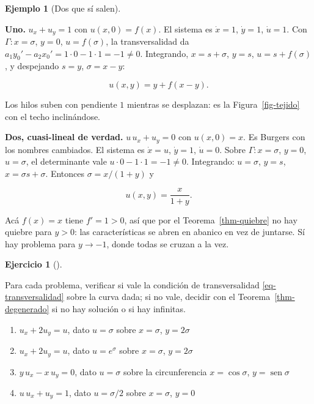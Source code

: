 \documentclass[
  spanish,
  a4paper,
]{scrbook}
\providecommand{\tightlist}{%
  \setlength{\itemsep}{0pt}\setlength{\parskip}{0pt}}
\theoremstyle{definition}
\theoremstyle{plain}
\theoremstyle{definition}
\newtheorem{example}{Ejemplo}[chapter]
\theoremstyle{plain}
\theoremstyle{definition}
\newtheorem{exercise}{Ejercicio}[chapter]
\theoremstyle{remark}
\begin{document}
\begin{example}[Dos que sí
salen]\protect\hypertarget{exm-dos-buenos}{}\label{exm-dos-buenos}

\textbf{Uno.} \(u_x + u_y = 1\) con \(u(x,0) = f(x)\). El sistema es
\(\dot x = 1\), \(\dot y = 1\), \(\dot u = 1\). Con
\(\Gamma: x=\sigma\), \(y=0\), \(u=f(\sigma)\), la transversalidad da
\(a_1y_0' - a_2x_0' = 1\cdot 0 - 1\cdot 1 = -1 \ne 0\). Integrando,
\(x = s+\sigma\), \(y = s\), \(u = s + f(\sigma)\), y despejando
\(s = y\), \(\sigma = x - y\):

\[
u(x,y) = y + f(x-y).
\]

Los hilos suben con pendiente \(1\) mientras se desplazan: es la
Figura~\ref{fig-tejido} con el techo inclinándose.

\textbf{Dos, cuasi-lineal de verdad.} \(u\,u_x + u_y = 0\) con
\(u(x,0) = x\). Es Burgers con los nombres cambiados. El sistema es
\(\dot x = u\), \(\dot y = 1\), \(\dot u = 0\). Sobre
\(\Gamma: x=\sigma\), \(y=0\), \(u=\sigma\), el determinante vale
\(u\cdot 0 - 1\cdot 1 = -1 \ne 0\). Integrando: \(u = \sigma\),
\(y = s\), \(x = \sigma s + \sigma\). Entonces \(\sigma = x/(1+y)\) y

\[
u(x,y) = \frac{x}{1+y}.
\]

Acá \(f(x)=x\) tiene \(f' = 1 > 0\), así que por el
Teorema~\ref{thm-quiebre} no hay quiebre para \(y>0\): las
características se abren en abanico en vez de juntarse. Sí hay problema
para \(y \to -1\), donde todas se cruzan a la vez.

\end{example}

\begin{exercise}[]\protect\hypertarget{exr-transversalidad-cuentas}{}\label{exr-transversalidad-cuentas}

Para cada problema, verificar si vale la condición de transversalidad
\ref{eq-transversalidad} sobre la curva dada; si no vale, decidir con el
Teorema~\ref{thm-degenerado} si no hay solución o si hay infinitas.

\begin{enumerate}
\def\labelenumi{\alph{enumi}.}
\tightlist
\item
  \(u_x + 2u_y = u\), dato \(u = \sigma\) sobre \(x=\sigma\),
  \(y=2\sigma\)
\item
  \(u_x + 2u_y = u\), dato \(u = e^{\sigma}\) sobre \(x=\sigma\),
  \(y=2\sigma\)
\item
  \(y\,u_x - x\,u_y = 0\), dato \(u = \sigma\) sobre la circunferencia
  \(x=\cos\sigma\), \(y=\operatorname{sen}\sigma\)
\item
  \(u\,u_x + u_y = 1\), dato \(u = \sigma/2\) sobre \(x=\sigma\),
  \(y=0\)
\end{enumerate}

\end{exercise}
\end{document}
